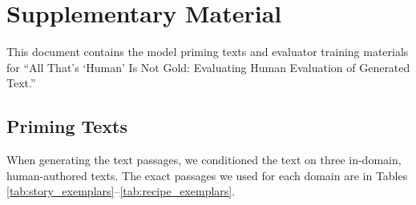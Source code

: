 \clearpage \newpage

\section{Supplementary Material}
This document contains the model priming texts and evaluator training materials for ``All That's `Human' Is Not Gold:  Evaluating Human Evaluation of Generated Text.''


\subsection{Priming Texts}\label{sup:exemplars}
When generating the text passages, we conditioned the text on three in-domain, human-authored texts. The exact passages we used for each domain are in Tables \ref{tab:story_exemplars}--\ref{tab:recipe_exemplars}.


